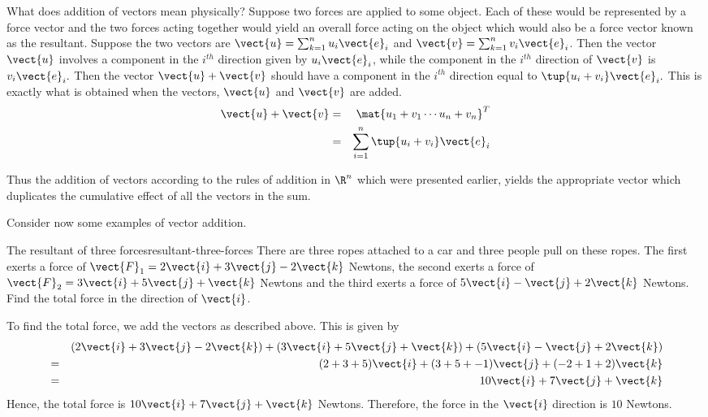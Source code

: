 What does addition of vectors mean physically? Suppose two forces are
applied to some object. Each of these would be represented by a force vector
and the two forces acting together would yield an overall force acting on
the object which would also be a force vector known as the
resultant. Suppose the two vectors are $\vect{u}=\sum_{k=1}^{n}u_{i}\vect{e}_{i}$ and $\vect{v}=\sum_{k=1}^{n}v_{i}\vect{e}_{i}$. Then the vector $\vect{u}$ involves a component in the $
i^{th}$ direction given by $u_{i}\vect{e}_{i}$, while the component in the $i^{th}$
direction of $\vect{v}$ is $v_{i}\vect{e}_{i}.$ Then the vector $\vect{u} + \vect{v}$ should have a component in the $i^{th}$
direction equal to $\tup{u_{i}+v_{i}} \vect{e}_{i}.$ This is
exactly what is obtained when the vectors, $\vect{u}$ and $\vect{v}$ are
added.
\begin{eqnarray*}
\vect{u}+\vect{v}& =&\mat{u_{1}+v_{1} \cdots u_{n}+v_{n}}^T  \\
& =&\sum_{i=1}^{n}\tup{u_{i}+v_{i}} \vect{e}_{i}
\end{eqnarray*}

Thus the addition of vectors according to the rules of addition in $\R^{n}$ which were presented earlier, yields the appropriate vector which
duplicates the cumulative effect of all the vectors in the sum.

Consider now some examples of vector addition.

\begin{example}{The resultant of three forces}{resultant-three-forces}
There are three ropes attached to a car and three people pull on these
ropes. The first exerts a force of $\vect{F}_1 = 
2\vect{i} + 3\vect{j} -2 \vect{k}$ Newtons, the second exerts a force of $\vect{F}_2
=
3\vect{i}+5\vect{j}+\vect{k}$ Newtons
and the third exerts a force of $5\vect{i}-\vect{j}+2\vect{k}$ Newtons. Find
the total force in the direction of $\vect{i}$.
\end{example}

\begin{solution}
To find the total force, we add the vectors as described above. 
This is given by 
\begin{eqnarray*}
&&(2\vect{i}+3\vect{j}-2\vect{k}) + (3\vect{i}+5\vect{j}+\vect{k}) + (5\vect{i}-\vect{j}+2\vect{k})\\
&=&
(2  + 3 + 5) \vect{i} + (3 + 5 + -1) \vect{j} + (-2+1+2) \vect{k} \\
&=&
10 \vect{i} + 7 \vect{j} + \vect{k}
\end{eqnarray*}
Hence, the total force is  $10\vect{i}+7\vect{j}+\vect{k}$ Newtons. Therefore, the force in the $
\vect{i}$ direction is $10$ Newtons.
\end{solution}

